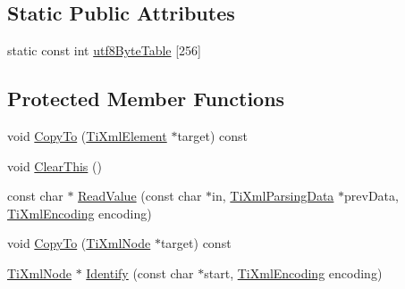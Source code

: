 \subsection*{Static Public Attributes}
\begin{DoxyCompactItemize}
\item 
static const int \hyperlink{classTiXmlBase_ac8c86058137bdb4b413c3eca58f2d467}{utf8ByteTable} \mbox{[}256\mbox{]}
\end{DoxyCompactItemize}
\subsection*{Protected Member Functions}
\begin{DoxyCompactItemize}
\item 
void \hyperlink{classTiXmlElement_a9e0c1983b840de4134f1f6bf7af00b0f}{CopyTo} (\hyperlink{classTiXmlElement}{TiXmlElement} $\ast$target) const 
\item 
void \hyperlink{classTiXmlElement_a5670933ec2d7d9763b9891acc05d7f7d}{ClearThis} ()
\item 
const char $\ast$ \hyperlink{classTiXmlElement_ac786bce103042d3837c4cc2ff6967d41}{ReadValue} (const char $\ast$in, \hyperlink{classTiXmlParsingData}{TiXmlParsingData} $\ast$prevData, \hyperlink{tinyxml_8h_a88d51847a13ee0f4b4d320d03d2c4d96}{TiXmlEncoding} encoding)
\item 
void \hyperlink{classTiXmlNode_ab6056978923ad8350fb5164af32d8038}{CopyTo} (\hyperlink{classTiXmlNode}{TiXmlNode} $\ast$target) const 
\item 
\hyperlink{classTiXmlNode}{TiXmlNode} $\ast$ \hyperlink{classTiXmlNode_ac1e3a8e7578be463b04617786120c2bb}{Identify} (const char $\ast$start, \hyperlink{tinyxml_8h_a88d51847a13ee0f4b4d320d03d2c4d96}{TiXmlEncoding} encoding)
\end{DoxyCompactItemize}
